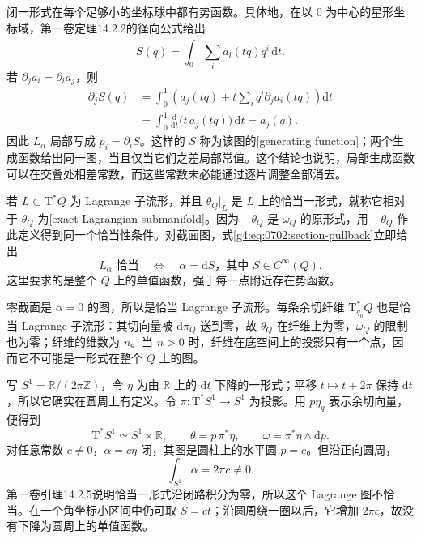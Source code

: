 \ProseParagraphBreak

闭一形式在每个足够小的坐标球中都有势函数。具体地，在以 \(0\) 为中心的星形坐标域，第一卷定理14.2.2的径向公式给出
\[
	S(q)=\int_0^1\sum_i a_i(tq)q^i\,\mathrm{d}t.
\]
若 \(\partial_j a_i=\partial_i a_j\)，则
\[
	\begin{aligned}
		\partial_jS(q)
		&=\int_0^1\left(a_j(tq)+t\sum_iq^i\partial_j a_i(tq)\right)\mathrm{d}t\\
		&=\int_0^1\frac{\mathrm{d}}{\mathrm{d}t}
			\bigl(t\,a_j(tq)\bigr)\,\mathrm{d}t=a_j(q).
	\end{aligned}
\]
因此 \(L_\alpha\) 局部写成 \(p_i=\partial_iS\)。这样的 \(S\) 称为该图的[generating function]；两个生成函数给出同一图，当且仅当它们之差局部常值。这个结论也说明，局部生成函数可以在交叠处相差常数，而这些常数未必能通过逐片调整全部消去。

\ProseParagraphBreak

若 \(L\subset\mathrm{T}^*Q\) 为 Lagrange 子流形，并且 \(\theta_Q|_L\) 是 \(L\) 上的恰当一形式，就称它相对于 \(\theta_Q\) 为[exact Lagrangian submanifold]。因为 \(-\theta_Q\) 是 \(\omega_Q\) 的原形式，用 \(-\theta_Q\) 作此定义得到同一个恰当性条件。对截面图，式\eqref{g4:eq:0702:section-pullback}立即给出
\[
	L_\alpha\text{ 恰当}
	\quad\Longleftrightarrow\quad
	\alpha=\mathrm{d}S\text{，其中 }S\in C^\infty(Q).
\]
这里要求的是整个 \(Q\) 上的单值函数，强于每一点附近存在势函数。

\begin{example}
	\label{g4:exm:0702:zero-fiber}
	零截面是 \(\alpha=0\) 的图，所以是恰当 Lagrange 子流形。每条余切纤维 \(\mathrm{T}_{q_0}^*Q\) 也是恰当 Lagrange 子流形：其切向量被 \(\mathrm{d}\pi_Q\) 送到零，故 \(\theta_Q\) 在纤维上为零，\(\omega_Q\) 的限制也为零；纤维的维数为 \(n\)。当 \(n>0\) 时，纤维在底空间上的投影只有一个点，因而它不可能是一形式在整个 \(Q\) 上的图。
\end{example}

\begin{example}
	\label{g4:exm:0702:circle-nonexact-graph}
	写 \(S^1=\mathbb R/(2\pi\mathbb Z)\)，令 \(\eta\) 为由 \(\mathbb R\) 上的 \(\mathrm{d}t\) 下降的一形式；平移 \(t\mapsto t+2\pi\) 保持 \(\mathrm{d}t\)，所以它确实在圆周上有定义。令 \(\pi:\mathrm{T}^*S^1\to S^1\) 为投影。用 \(p\eta_q\) 表示余切向量，便得到
	\[
		\mathrm{T}^*S^1\simeq S^1\times\mathbb R,\qquad
		\theta=p\,\pi^*\eta,\qquad \omega=\pi^*\eta\wedge\mathrm{d}p.
	\]
	对任意常数 \(c\ne0\)，\(\alpha=c\eta\) 闭，其图是圆柱上的水平圆 \(p=c\)。但沿正向圆周，
	\[
		\int_{S^1}\alpha=2\pi c\ne0.
	\]
	第一卷引理14.2.5说明恰当一形式沿闭路积分为零，所以这个 Lagrange 图不恰当。在一个角坐标小区间中仍可取 \(S=ct\)；沿圆周绕一圈以后，它增加 \(2\pi c\)，故没有下降为圆周上的单值函数。
\end{example}

